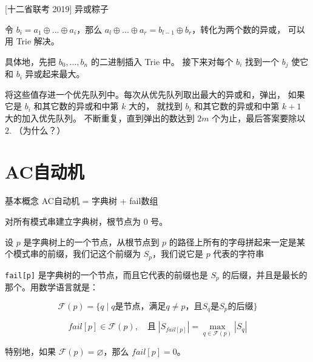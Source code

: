 \documentclass{beamer}
\begin{document}
\begin{frame}[fragile]{[十二省联考 2019] 异或粽子}
    \small

    令 $b_i=a_1\oplus...\oplus a_i$，那么 $a_l\oplus...\oplus a_r=b_{l-1}\oplus b_r$，转化为两个数的异或，
    可以用 Trie 解决。

    \vspace{1em}\pause
    具体地，先把 $b_0,...,b_n$ 的二进制插入 Trie 中。
    接下来对每个 $b_i$ 找到一个 $b_j$ 使它和 $b_i$ 异或起来最大。

    \vspace{1em}\pause
    将这些值存进一个优先队列中。每次从优先队列取出最大的异或和，弹出，
    如果它是 $b_i$ 和其它数的异或和中第 $k$ 大的，
    就找到 $b_i$ 和其它数的异或和中第 $k+1$ 大的加入优先队列。
    不断重复，直到弹出的数达到 $2m$ 个为止，最后答案要除以 $2$. （为什么？）
\end{frame}

\section{AC自动机}

\begin{frame}[fragile]{基本概念}
    \small
    AC自动机 = 字典树 + fail数组

    \vspace{1em}
    对所有模式串建立字典树，根节点为 $0$ 号。
    
    \vspace{1em}\pause
    设 $p$ 是字典树上的一个节点，从根节点到 $p$ 的路径上所有的字母拼起来一定是某个模式串的前缀，我们记这个前缀为 $S_p$，我们说它是 $p$ 代表的字符串
    
    \vspace{1em}\pause
    \verb|fail[p]| 是字典树的一个节点，而且它代表的前缀也是 $S_p$ 的后缀，并且是最长的那个。\pause 用数学语言就是：
    
    \begin{equation*}
        \mathcal{F}(p)=\{q \;|\; q \text{是节点，满足} q\neq p \text{，且} S_q \text{是} S_p \text{的后缀}\}
    \end{equation*}
    
    \begin{equation*}
        fail[p]\in\mathcal{F}(p),\quad \text{且} \;|S_{fail[p]}| = \max_{q\in \mathcal{F}(p)} |S_q|
    \end{equation*}
    
    \pause 特别地，如果 $\mathcal{F}(p)=\varnothing$，那么 $fail[p]=0$。
\end{frame}
\end{document}

